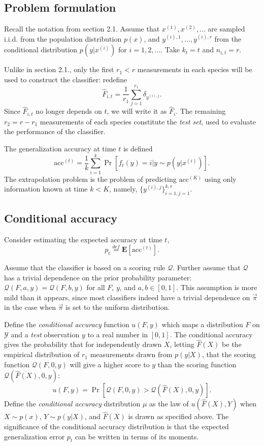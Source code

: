 \documentclass{article}
\newcommand{\E}{\textbf{E}}
\begin{document}
\subsection{Problem formulation}

Recall the notation from section 2.1. Assume that
$x^{(1)}, x^{(2)}, \hdots$ are sampled i.i.d. from the population distribution $p(x)$, 
and $y^{(i), 1}, \hdots, y^{(i), r}$ from the conditional
distribution $p(y|x^{(i)})$ for $i = 1, 2, \hdots$.
Take $k_t = t$ and $n_{i, t} = r$.

Unlike in section 2.1., only the first $r_1 < r$ measurements in each species will
be used to construct the classifier: redefine
\[
\hat{F}_{i, t} = \frac{1}{r_1} \sum_{j=1}^{r_1} \delta_{y^{(i), j}}.
\]
Since $\hat{F}_{i, t}$ no longer depends on $t$, we will write it as $\hat{F}_i$.
The remaining $r_2 = r - r_1$ measurements of each species constitute the \emph{test set},
used to evaluate the performance of the classifier.

The generalization accuracy at time $t$ is defined
\[
\text{acc}^{(t)} = \frac{1}{k}\sum_{i=1}^k \Pr[f_t(y) = i|y \sim p(y|x^{(i)})].
\]
The extrapolation problem is the problem of predicting $\text{acc}^{(K)}$ using
only information known at time $k < K$, namely,
$\{y^{(i), j}\}_{i=1, j=1}^{k, r}$.

\subsection{Conditional accuracy}

Consider estimating the expected accuracy at time $t$, \[p_t \stackrel{def}{=} \E[\text{acc}^{(t)}].\]

Assume that the classifier is based on a scoring rule $\mathcal{Q}$.
Further assume that $\mathcal{Q}$ has a trivial dependence on the prior probability parameter: 
$\mathcal{Q}(F, a, y) = \mathcal{Q}(F, b, y)$ for all $F$, $y$, and $a, b \in [0, 1]$.
This assumption is more mild than it appears, since most classifiers indeed have a trivial dependence on $\vec{\pi}$
in the case when $\vec{\pi}$ is set to the uniform distribution.

Define the \emph{conditional accuracy} function $u(F, y)$ which
maps a distribution $F$ on $\mathcal{Y}$ and a \emph{test} observation $y$ to a real number in $[0,1]$.
The conditional accuracy gives the probability that for independently
drawn $X$, letting $\hat{F}(X)$ be the empirical distribution of $r_1$ measurements drawn from $p(y|X)$,
that the scoring function $\mathcal{Q}(F, 0, y)$ will give a higher score to $y$ than
the scoring function $\mathcal{Q}(\hat{F}(X), 0, y)$:
\[
u(F, y) = \Pr[\mathcal{Q}(F, 0, y) > \mathcal{Q}(\hat{F}(X), 0, y)].
\]
Define the \emph{conditional accuracy} distribution $\mu$ as the law of
$u(\hat{F}(X), Y)$ when $X \sim p(x)$, $Y\sim p(y|X)$, and $\hat{F}(X)$ is
drawn as specified above.  The significance of the conditional
accuracy distribution is that the expected generalization error $p_t$
can be written in terms of its moments.
\end{document}

